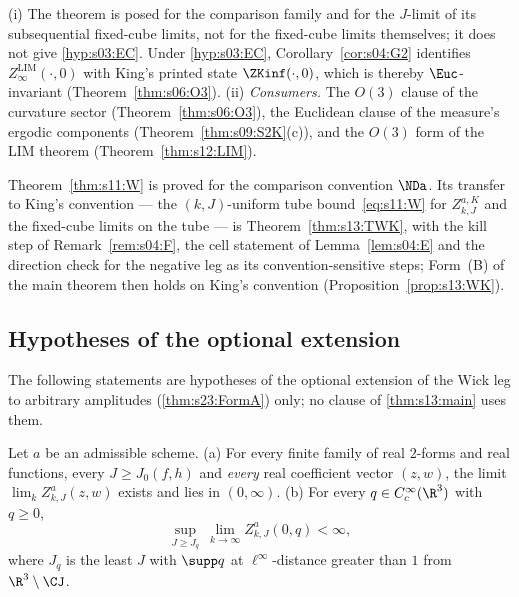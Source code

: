\begin{remark}\label{rem:s03:RC}
(i) The theorem is posed for the comparison family and for the $J$-limit of its subsequential fixed-cube limits, not for the fixed-cube limits themselves; it does not give \cref{hyp:s03:EC}. Under \cref{hyp:s03:EC}, Corollary~\ref{cor:s04:G2} identifies $Z^{\mathrm{LIM}}_\infty(\cdot,0)$ with King's printed state $\ZKinf(\cdot,0)$, which is thereby $\Euc$-invariant (Theorem~\ref{thm:s06:O3}).
(ii) \emph{Consumers.} The $O(3)$ clause of the curvature sector (Theorem~\ref{thm:s06:O3}), the Euclidean clause of the measure's ergodic components (Theorem~\ref{thm:s09:S2K}(c)), and the $O(3)$ form of the LIM theorem (Theorem~\ref{thm:s12:LIM}).
\end{remark}

\begin{remark}\label{rem:s03:TWK}
Theorem~\ref{thm:s11:W} is proved for the comparison convention $\NDa$. Its transfer to King's convention --- the $(k,J)$-uniform tube bound~\eqref{eq:s11:W} for $Z^{a,K}_{k,J}$ and the fixed-cube limits on the tube --- is Theorem~\ref{thm:s13:TWK}, with the kill step of Remark~\ref{rem:s04:F}, the cell statement of Lemma~\ref{lem:s04:E} and the direction check for the negative leg as its convention-sensitive steps; Form~(B) of the main theorem then holds on King's convention (Proposition~\ref{prop:s13:WK}).
\end{remark}

\subsection{Hypotheses of the optional extension}

The following statements are hypotheses of the optional extension of the Wick leg to arbitrary amplitudes (\cref{thm:s23:FormA}) only; no clause of \cref{thm:s13:main} uses them.

\begin{hypothesis}\label{hyp:s03:W2}
Let $a$ be an admissible scheme. (a) For every finite family of real $2$-forms and real functions, every $J\ge J_0(f,h)$ and \emph{every} real coefficient vector $(z,w)$, the limit $\lim_kZ^a_{k,J}(z,w)$ exists and lies in $(0,\infty)$. (b) For every $q\in C^\infty_c(\R^3)$ with $q\ge0$,
\[
\sup_{J\ge J_q}\ \lim_{k\to\infty}Z^{a}_{k,J}(0,q)<\infty ,
\]
where $J_q$ is the least $J$ with $\supp q$ at $\ell^\infty$-distance greater than $1$ from $\R^3\setminus\CJ$.
\end{hypothesis}

